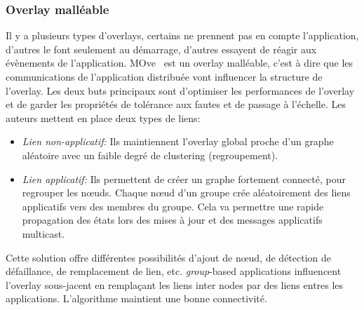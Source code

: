 		\subsubsection{Overlay malléable}
			Il y a plusieurs types d'overlays, certains ne prennent pas en compte l'application, d'autres le font seulement au démarrage, d'autres essayent de réagir aux évènements de l'application. MOve~\cite{10.1109/SRDS.2006.33} est un overlay malléable, c'est à dire que les communications de l'application distribuée vont influencer la structure de l'overlay. Les deux buts principaux sont d'optimiser les performances de l'overlay et de garder les propriétés de tolérance aux fautes et de passage à l'échelle. Les auteurs mettent en place deux types de liens:
		\begin{itemize}
	        \renewcommand{\labelitemi}{$\bullet$}
	                \item \textit{Lien non-applicatif:} Ils maintiennent l'overlay global proche d'un graphe aléatoire avec un faible degré de clustering (regroupement).
        	        \item \textit{Lien applicatif:} Ils  permettent de créer un graphe fortement connecté, pour regrouper les nœuds. Chaque nœud d'un groupe crée aléatoirement des liens applicatifs vers des membres du groupe. Cela va permettre une rapide propagation des états lors des mises à jour et des messages applicatifs multicast.
        	\end{itemize}
        Cette solution offre différentes possibilités d'ajout de nœud, de détection de défaillance, de remplacement de lien, etc. \textit{group}-based applications influencent l'overlay sous-jacent en remplaçant les liens inter nodes par des liens entres les applications. L'algorithme maintient une bonne connectivité.
